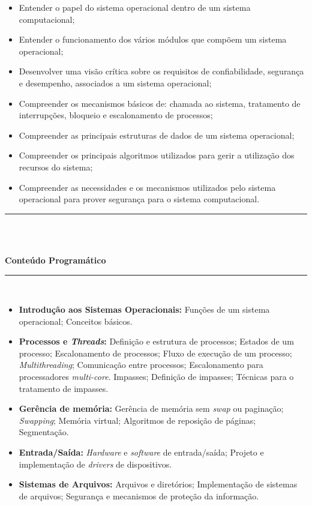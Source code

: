 \begin{itemize}
\item Entender o papel do sistema operacional dentro de um sistema computacional;
\item Entender o funcionamento dos vários módulos que compõem um sistema operacional;
\item Desenvolver uma visão crítica sobre os requisitos de confiabilidade, segurança e desempenho, associados a um sistema operacional;
\item Compreender os mecanismos básicos de: chamada ao sistema, tratamento de interrupções, bloqueio e escalonamento de processos;
\item Compreender as principais estruturas de dados de um sistema operacional;
\item Compreender os principais algoritmos utilizados para gerir a utilização dos recursos do sistema;
\item Compreender as necessidades e os mecanismos utilizados pelo sistema operacional para prover segurança para o sistema computacional.

\end{itemize} 
\noindent\rule{16.5cm}{0.4pt}\\
\\
\vspace{-12mm}
\begin{center}\textbf{Conteúdo Programático}\end{center}
\vspace{-5mm}
\noindent\rule{16.5cm}{0.4pt}
\\
\begin{itemize}

 \item \textbf{Introdução aos Sistemas Operacionais:} Funções de um sistema operacional; Conceitos básicos.

 \item \textbf{Processos e \textit{Threads}:} Definição e estrutura de processos; Estados de um processo; Escalonamento de processos; Fluxo de execução de um processo; \textit{Multithreading}; Comunicação entre processos; Escalonamento para processadores \textit{multi-core}. Impasses; Definição de impasses; Técnicas para o tratamento de impasses.

 \item \textbf{Ger\^encia de mem\'oria:} Gerência de memória sem \textit{swap} ou paginação; \textit{Swapping}; Memória virtual; Algoritmos de reposição de páginas; Segmentação.

 \item \textbf{Entrada/Saída:} \textit{Hardware} e \textit{software} de entrada/saída; Projeto e implementação de \textit{drivers} de dispositivos.

 \item \textbf{Sistemas de Arquivos:} Arquivos e diretórios; Implementação de sistemas de arquivos; Segurança e mecanismos de proteção da informação.

\end{itemize}
